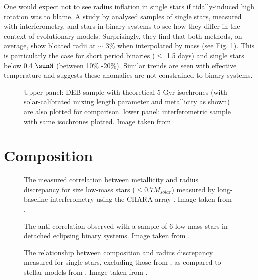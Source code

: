One would expect not to see radius inflation in single stars if tidally-induced high rotation was to blame. A study by \cite{Spada2013} analysed samples of single stars, measured with interferometry, and stars in binary systems to see how they differ in the context of evolutionary models. Surprisingly, they find that both methods, on average, show bloated radii at $\sim$ 3\% when interpolated by mass (see Fig. \ref{massradius}). This is particularly the case for short period binaries ($\leq$ 1.5 days) and single stars below 0.4 $\sunM$ (between 10\% -20\%). Similar trends are seen with effective temperature and suggests these anomalies are not constrained to binary systems.


\begin{figure}
\centering
\caption{Upper panel: DEB sample with theoretical 5 Gyr isochrones (with solar-calibrated mixing length parameter and metallicity as shown) are also plotted for comparison. lower panel: interferometric sample with same isochrones plotted. Image taken from \protect\cite{Spada2013}}
\label{massradius}
\end{figure}


\section{Composition}

\begin{figure}
\centering
\caption{The measured correlation between metallicity and radius discrepancy for size low-mass stars ($\leq 0.7 M_{solar}$) measured by long-baseline interferometry using the CHARA array \protect\cite{Chabrier1997}. Image taken from \protect\cite{Berger2006}.}
\label{bergmetal}
\end{figure}

\begin{figure}
\centering
\caption{The anti-correlation observed with a sample of 6 low-mass stars in detached eclipsing binary systems. Image taken from \protect\cite{Feiden2013}.}
\label{feid1}
\end{figure}

\begin{figure}
\centering
\caption{The relationship between composition and radius discrepancy measured for single stars, excluding those from \protect\cite{Berger2006}, as compared to stellar models from \protect\cite{Baraffe1998}. Image taken from \protect\cite{Demory2009}. }
\label{normmetal}
\end{figure}


